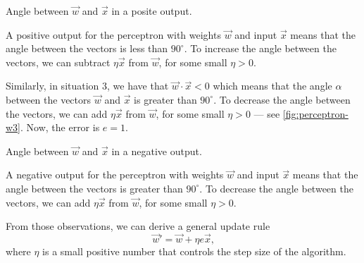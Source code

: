 \begin{figurebox}[label=fig:perceptron-w2]{Angle between $\vec{w}$ and $\vec{x}$ in a posite output.}
  \centering
  \tcblower
  A positive output for the perceptron with weights $\vec{w}$ and input $\vec{x}$ means
  that the angle between the vectors is less than $90^\circ$.  To increase the angle
  between the vectors, we can subtract $\eta\vec{x}$ from $\vec{w}$, for some small $\eta
  > 0$.
\end{figurebox}

Similarly, in situation 3, we have that $\vec{w} \cdot \vec{x} < 0$ which means that the
angle $\alpha$ between the vectors $\vec{w}$ and $\vec{x}$ is greater than $90^\circ$.
To decrease the angle between the vectors, we can add $\eta\vec{x}$ from $\vec{w}$, for
some small $\eta > 0$ --- see \cref{fig:perceptron-w3}.  Now, the error is $e = 1$.

\begin{figurebox}[label=fig:perceptron-w3]{Angle between $\vec{w}$ and $\vec{x}$ in a negative output.}
  \centering
  \tcblower
  A negative output for the perceptron with weights $\vec{w}$ and input $\vec{x}$ means
  that the angle between the vectors is greater than $90^\circ$.  To decrease the angle
  between the vectors, we can add $\eta\vec{x}$ from $\vec{w}$, for some small $\eta
  > 0$.
\end{figurebox}

From those observations, we can derive a general update rule
\[
  \vec{w}' = \vec{w} + \eta e \vec{x}\text{,}
\]
where $\eta$ is a small positive number that controls the step size of the algorithm.


